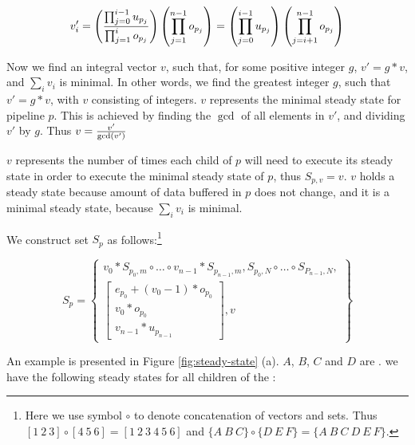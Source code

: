 \begin{displaymath}
v'_i = \left({\prod_{j = 0}^{i-1} u_{p_j} \over \prod_{j=1}^i
o_{p_j}} \right) \left(\prod_{j=1}^{n-1} o_{p_j} \right) = \left(
\prod_{j=0}^{i-1} u_{p_j} \right) \left( \prod_{j=i+1}^{n-1}
o_{p_j} \right)
\end{displaymath}

Now we find an integral vector $v$, such that, for some positive
integer $g$, $v' = g * v$, and $\sum_i v_i$ is minimal.  In other
words, we find the greatest integer $g$, such that $v' = g * v$,
with $v$ consisting of integers.  $v$ represents the minimal
steady state for pipeline $p$. This is achieved by finding the
$\gcd$ of all elements in $v'$, and dividing $v'$ by $g$.  Thus $v
= {v' \over \gcd(v')}$

$v$ represents the number of times each child of $p$ will need to
execute its steady state in order to execute the minimal steady
state of $p$, thus $S_{p,v} = v$.  $v$ holds a steady state
because amount of data buffered in $p$ does not change, and it is
a minimal steady state, because $\sum_i v_i$ is minimal.

We construct set $S_p$ as follows:\footnote{Here we use symbol
$\circ$ to denote concatenation of vectors and sets.  Thus $[1\ 2\
3] \circ [4\ 5\ 6] = [1\ 2\ 3\ 4\ 5\ 6]$ and $\{A\ B\ C\} \circ
\{D\ E\ F\} = \{A\ B\ C\ D\ E\ F\}$.}

\begin{displaymath}
S_p = \left\{ \begin{array}{c} v_0 * S_{p_0,m} \circ \dots \circ
v_{n-1}
* S_{p_{n-1}, m}, S_{p_0, N} \circ \dots \circ S_{P_{n-1}, N}, \\
\left[
\begin{array}{c}
e_{p_0} + (v_0 - 1) * o_{p_0} \\
v_0 * o_{p_0} \\
v_{n-1} * u_{p_{n-1}}
\end{array}\right], v \end{array} \right\}
\end{displaymath}

An example is presented in Figure \ref{fig:steady-state} (a). $A$,
$B$, $C$ and $D$ are {\filters}.
we have the following steady states for all children of the
{\pipeline}:

